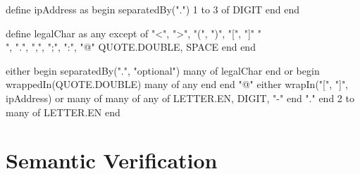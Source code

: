 \begin{rexregexBox}[float=htbp,title={RexRegex Code for Validating Email Addresses},breakable,label=code:emailPattern,width=13cm,center,listing options={style=rexregex,basicstyle=\small\ttfamily}]
define ipAddress as
    begin separatedBy(".")
        1 to 3 of DIGIT
    end
end

define legalChar as
    any except of
        "<", ">", "(", ")", "[", "]"
        "\\", ".", ",", ";", ":", "@"
        QUOTE.DOUBLE, SPACE
    end
end

either
    begin separatedBy(".", "optional")
        many of legalChar
    end
or
    begin wrappedIn(QUOTE.DOUBLE)
        many of any
    end
end
"@"
either
    wrapIn("[", "]", ipAddress)
or
    many of
        many of
            any of LETTER.EN, DIGIT, "-"
        end
        "."
    end
    2 to many of LETTER.EN
end
\end{rexregexBox}

{
\hypersetup{citecolor=white}
\begin{listingBox}[float=htb,title={Regex for Validating Email Addresses \cite{EmailRegex}},label=code:emailRegex]
    
\end{listingBox}
}

\section{Semantic Verification} \label{sec:verification}

